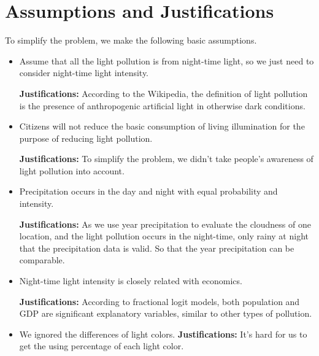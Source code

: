 \MinParskip{}
\section{Assumptions and Justifications} 
To simplify the problem, we make the following basic assumptions.

\begin{itemize}
    \item Assume that all the light pollution is from night-time light, so we just need to consider night-time light intensity.  

    \textbf{Justifications: }According to the Wikipedia\cite{wiki}, the definition of light pollution is the presence of anthropogenic artificial light in otherwise dark conditions. 

    \item Citizens will not reduce the basic consumption of living illumination for the purpose of reducing light pollution.
    
    \textbf{Justifications: }To simplify the problem, we didn't take people's awareness of light pollution into account.

    \item Precipitation occurs in the day and night with equal probability and intensity.
    
    \textbf{Justifications: }As we use year precipitation to evaluate the cloudness of one location, and the light pollution occurs in the night-time, only rainy at night that the precipitation data is valid. So that the year precipitation can be comparable.

    \item Night-time light intensity is closely related with economics.
    
    \textbf{Justifications: }According to fractional logit models\cite{GALLAWAY2010658}, both population and GDP are significant explanatory variables, similar to other types of pollution. 

    \item We ignored the differences of light colors.
    \textbf{Justifications: }It's hard for us to get the using percentage of each light color.
\end{itemize}

